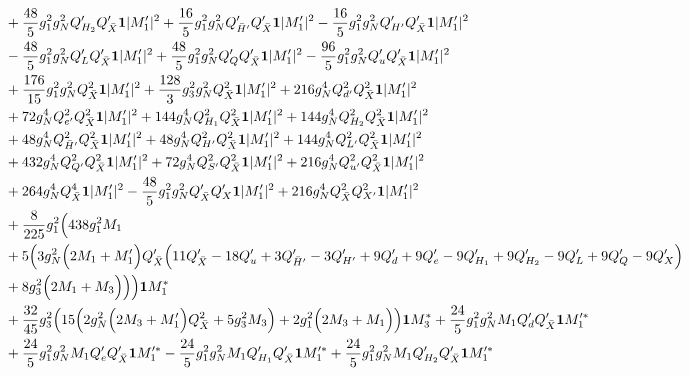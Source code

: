 {\begin{align}
 &+\frac{48}{5} g_{1}^{2} g_{N}^{2} Q_{H_2}' Q_{\bar{X}}' {\bf 1} |M_1'|^2 +\frac{16}{5} g_{1}^{2} g_{N}^{2} Q_{\bar{H}'}' Q_{\bar{X}}' {\bf 1} |M_1'|^2 -\frac{16}{5} g_{1}^{2} g_{N}^{2} Q_{H'}' Q_{\bar{X}}' {\bf 1} |M_1'|^2 \nonumber \\ 
 &-\frac{48}{5} g_{1}^{2} g_{N}^{2} Q_L' Q_{\bar{X}}' {\bf 1} |M_1'|^2 +\frac{48}{5} g_{1}^{2} g_{N}^{2} Q_Q' Q_{\bar{X}}' {\bf 1} |M_1'|^2 -\frac{96}{5} g_{1}^{2} g_{N}^{2} Q_u' Q_{\bar{X}}' {\bf 1} |M_1'|^2 \nonumber \\ 
 &+\frac{176}{15} g_{1}^{2} g_{N}^{2} Q_{\bar{X}}^{2} {\bf 1} |M_1'|^2 +\frac{128}{3} g_{3}^{2} g_{N}^{2} Q_{\bar{X}}^{2} {\bf 1} |M_1'|^2 +216 g_{N}^{4} Q_{d'}^{2} Q_{\bar{X}}^{2} {\bf 1} |M_1'|^2 \nonumber \\ 
 &+72 g_{N}^{4} Q_{e'}^{2} Q_{\bar{X}}^{2} {\bf 1} |M_1'|^2 +144 g_{N}^{4} Q_{H_1}^{2} Q_{\bar{X}}^{2} {\bf 1} |M_1'|^2 +144 g_{N}^{4} Q_{H_2}^{2} Q_{\bar{X}}^{2} {\bf 1} |M_1'|^2 \nonumber \\ 
 &+48 g_{N}^{4} Q_{\bar{H}'}^{2} Q_{\bar{X}}^{2} {\bf 1} |M_1'|^2 +48 g_{N}^{4} Q_{H'}^{2} Q_{\bar{X}}^{2} {\bf 1} |M_1'|^2 +144 g_{N}^{4} Q_{L'}^{2} Q_{\bar{X}}^{2} {\bf 1} |M_1'|^2 \nonumber \\ 
 &+432 g_{N}^{4} Q_{Q'}^{2} Q_{\bar{X}}^{2} {\bf 1} |M_1'|^2 +72 g_{N}^{4} Q_{S'}^{2} Q_{\bar{X}}^{2} {\bf 1} |M_1'|^2 +216 g_{N}^{4} Q_{u'}^{2} Q_{\bar{X}}^{2} {\bf 1} |M_1'|^2 \nonumber \\ 
 &+264 g_{N}^{4} Q_{\bar{X}}^{4} {\bf 1} |M_1'|^2 -\frac{48}{5} g_{1}^{2} g_{N}^{2} Q_{\bar{X}}' Q_X' {\bf 1} |M_1'|^2 +216 g_{N}^{4} Q_{\bar{X}}^{2} Q_{X'}^{2} {\bf 1} |M_1'|^2 \nonumber \\ 
 &+\frac{8}{225} g_{1}^{2} \Big(438 g_{1}^{2} M_1 \nonumber \\ 
 &+5 \Big(3 g_{N}^{2} \Big(2 M_1  + M_1'\Big)Q_{\bar{X}}' \Big(11 Q_{\bar{X}}'  -18 Q_u'  + 3 Q_{\bar{H}'}'  -3 Q_{H'}'  + 9 Q_d'  + 9 Q_e'  -9 Q_{H_1}'  + 9 Q_{H_2}'  -9 Q_L'  + 9 Q_Q'  -9 Q_X' \Big) \nonumber \\
&+ 8 g_{3}^{2} \Big(2 M_1  + M_3\Big)\Big)\Big){\bf 1} M_1^* \nonumber \\ 
 &+\frac{32}{45} g_{3}^{2} \Big(15 \Big(2 g_{N}^{2} \Big(2 M_3  + M_1'\Big)Q_{\bar{X}}^{2}  + 5 g_{3}^{2} M_3 \Big) + 2 g_{1}^{2} \Big(2 M_3  + M_1\Big)\Big){\bf 1} M_3^* +\frac{24}{5} g_{1}^{2} g_{N}^{2} M_1 Q_d' Q_{\bar{X}}' {\bf 1} M_1'^* \nonumber \\ 
 &+\frac{24}{5} g_{1}^{2} g_{N}^{2} M_1 Q_e' Q_{\bar{X}}' {\bf 1} M_1'^* -\frac{24}{5} g_{1}^{2} g_{N}^{2} M_1 Q_{H_1}' Q_{\bar{X}}' {\bf 1} M_1'^* +\frac{24}{5} g_{1}^{2} g_{N}^{2} M_1 Q_{H_2}' Q_{\bar{X}}' {\bf 1} M_1'^* \nonumber \\ 

\end{align}}
